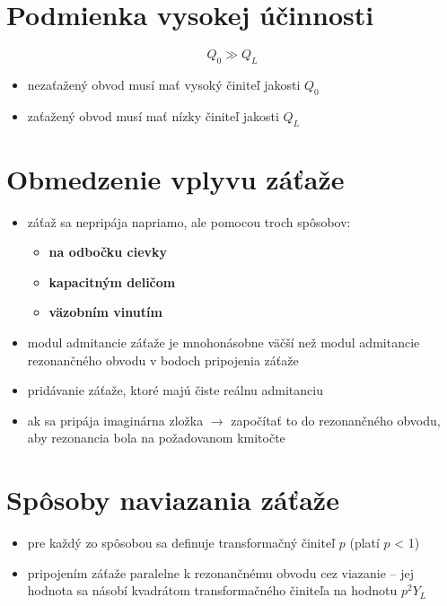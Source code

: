 {{	\section{Podmienka vysokej účinnosti}	
	\begin{equation}
		Q_0 \gg Q_L
	\end{equation}
	
	\begin{itemize}[label=--]
		\item nezaťažený obvod musí mať vysoký činiteľ jakosti $Q_0$
		\item zaťažený obvod musí mať nízky činiteľ jakosti $Q_L$
	\end{itemize}
	\section{Obmedzenie vplyvu záťaže}
	\begin{itemize}[label=--]
		\item záťaž sa nepripája napriamo, ale pomocou troch spôsobov:
			\begin{itemize}[label=$\rightarrow$]
				\item \textbf{na odbočku cievky}
				\item \textbf{kapacitným deličom}
				\item \textbf{väzobním vinutím}
			\end{itemize}
		\item modul admitancie záťaže je mnohonásobne väčší než modul admitancie rezonančného obvodu v bodoch pripojenia záťaže
		\item pridávanie záťaže, ktoré majú čiste reálnu admitanciu
		\item ak sa pripája imaginárna zložka $\rightarrow$ započítať to do rezonančného obvodu, aby rezonancia bola na požadovanom kmitočte
	\end{itemize}
	
	\section{Spôsoby naviazania záťaže}
	
		\begin{itemize}[label=--]
		\item pre každý zo spôsobou sa definuje transformačný činiteľ $p$ (platí $p$ < 1)
		\item pripojením záťaže paralelne k rezonančnému obvodu cez viazanie -- jej hodnota sa násobí kvadrátom transformačného činiteľa na hodnotu $p^2 Y_L$
	\end{itemize}
	
}}

